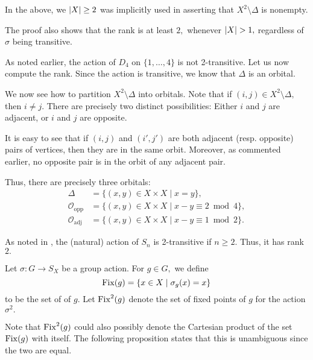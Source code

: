 In the above, we ${\left\lvert X \right\lvert} \ge 2$ was implicitly used in asserting that $X^2 \setminus \Delta$ is nonempty.

\begin{rem}
	The proof also shows that the rank is at least $2,$ whenever ${\left\lvert X \right\lvert} > 1,$ regardless of $\sigma$ being transitive.	
\end{rem}


\begin{ex}[Rank of $D_4$]
	As noted earlier, the action of $D_4$ on $\{1, \ldots, 4\}$ is not 2-transitive. Let us now compute the rank. Since the action is transitive, we know that $\Delta$ is an orbital.

	We now see how to partition $X^2 \setminus \Delta$ into orbitals. Note that if $(i, j) \in X^2 \setminus \Delta,$ then $i \neq j.$ There are precisely two distinct possibilities: Either $i$ and $j$ are adjacent, or $i$ and $j$ are opposite.

	It is easy to see that if $(i, j)$ and $(i', j')$ are both adjacent (resp. opposite) pairs of vertices, then they are in the same orbit. Moreover, as commented earlier, no opposite pair is in the orbit of any adjacent pair.

	Thus, there are precisely three orbitals:
	\begin{align*} 
		\Delta &= \{(x, y) \in X \times X \mid x = y\},\\
		\mathcal{O}_{\text{opp}} &= \{(x, y) \in X \times X \mid x - y \equiv 2 \bmod 4\},\\
		\mathcal{O}_{\text{adj}} &= \{(x, y) \in X \times X \mid x - y \equiv 1 \bmod 2\}.
	\end{align*}
\end{ex}

\begin{ex}[Rank of $S_n$]
	As noted in , the (natural) action of $S_n$ is 2-transitive if $n \ge 2.$ Thus, it has rank $2.$
\end{ex}

\begin{defn}
	Let $\sigma : G \to S_X$ be a group action. For $g \in G,$ we define
	\begin{equation*} 
		\operatorname{Fix}(g) = \{x \in X \mid \sigma_g(x) = x\}
	\end{equation*}
	to be the set of  of $g.$ Let $\operatorname{Fix}^2(g)$ denote the set of fixed points of $g$ for the action $\sigma^2.$
\end{defn}

Note that $\operatorname{Fix}^2(g)$ could also possibly denote the Cartesian product of the set $\operatorname{Fix}(g)$ with itself. The following proposition states that this is unambiguous since the two are equal.

